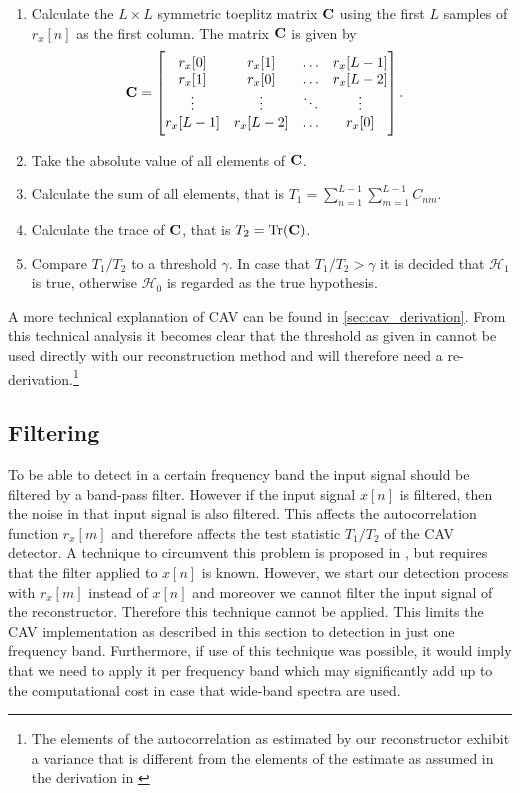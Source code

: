 \documentclass[a4paper, openany, oneside]{memoir}
\begin{document}
\begin{enumerate}[labelindent=0pt,labelwidth=\widthof{\ref{last-item3}},label=Step \arabic*:,itemindent=1em,leftmargin=!]
	\item Calculate the $L\times L$ symmetric toeplitz matrix $\boldsymbol{\mathbf{C}}$ using the first $L$ samples of $r_x[n]$ as the first column. The matrix $\boldsymbol{\mathbf{C}}$ is given by
	\begin{align}
		\boldsymbol{\mathbf{C}} &= \begin{bmatrix}
		r_x[0] & r_x[1] & \ldots & r_x[L-1] \\
		r_x[1] & r_x[0] & \ldots & r_x[L-2] \\
		\vdots & \vdots & \ddots & \vdots \\
		r_x[L-1] & r_x[L-2] & \ldots & r_x[0]
		\end{bmatrix}.
	\end{align}
	\item Take the absolute value of all elements of $\boldsymbol{\mathbf{C}}$.
	\item Calculate the sum of all elements, that is $T_1 = \sum_{n=1}^{L-1}\sum_{m=1}^{L-1} C_{nm}$.
	\item Calculate the trace of $\boldsymbol{\mathbf{C}}$, that is $T_2 = \text{Tr}(\boldsymbol{\mathbf{C}})$.
	\item Compare $T_1/T_2$ to a threshold $\gamma$. In case that $T_1/T_2 > \gamma$ it is decided that $\mathcal{H}_1$ is true, otherwise $\mathcal{H}_0$ is regarded as the true hypothesis.
    \label{last-item3}
\end{enumerate}

A more technical explanation of CAV can be found in \cref{sec:cav_derivation}. From this technical analysis it becomes clear that the threshold
as given in \cite{zheng2009spectrum} cannot be used directly with our reconstruction method and will therefore need a re-derivation.\footnote{The elements of the autocorrelation as estimated by our reconstructor exhibit a variance that is different from the elements of the estimate as assumed in the derivation in \cite{zheng2009spectrum}
}

\subsection{Filtering}
To be able to detect in a certain frequency band the input signal should be filtered by a band-pass filter. However if the input signal $x[n]$ is filtered, then the noise in that input signal is also filtered. This affects the autocorrelation function $r_x[m]$ and therefore affects the test statistic $T_1/T_2$ of the CAV detector.  A technique to circumvent this problem is proposed in \cite{zheng2009spectrum}, but requires that the filter applied to $x[n]$ is known. However, we start our detection process with $r_x[m]$ instead of $x[n]$ and moreover we cannot filter the input signal of the reconstructor. Therefore this technique cannot be applied.  This limits the CAV implementation as described in this section to detection in just one frequency band. Furthermore, if use of this technique was possible, it would imply that we need to apply it per frequency band which may significantly add up to the computational cost in case that wide-band spectra are used.
\end{document}
